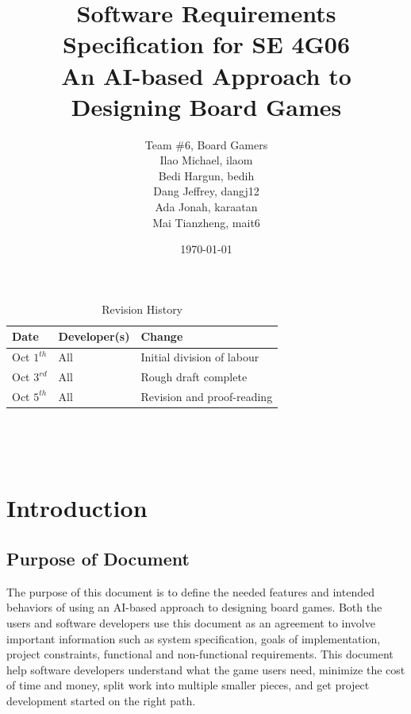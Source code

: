 \documentclass[12pt]{article}
\begin{document}
\begin{table}[hp]
\caption{Revision History} \label{TblRevisionHistory}
\begin{tabularx}{\textwidth}{llX}
\toprule
\textbf{Date} & \textbf{Developer(s)} & \textbf{Change}\\
\midrule
Oct $1^{th}$ & All & Initial division of labour\\
Oct $3^{rd}$ & All & Rough draft complete\\
Oct $5^{th}$ & All & Revision and proof-reading \\
\bottomrule
\end{tabularx}
\end{table}
\newpage

\title{Software Requirements Specification for SE 4G06 \\ An AI-based Approach to Designing Board Games} 
\author{Team \#6, Board Gamers
\\ Ilao Michael, ilaom
\\ Bedi Hargun, bedih
\\ Dang Jeffrey, dangj12
\\ Ada Jonah, karaatan
\\ Mai Tianzheng, mait6}
\date{\today}
	
\maketitle

~\newpage


\tableofcontents

~\newpage

\section{Introduction}
\subsection{Purpose of Document}

The purpose of this document is to define the needed features and intended behaviors of using an AI-based approach to designing board games. Both the users and software developers use this document as an agreement to involve important information such as system specification, goals of implementation, project constraints, functional and non-functional requirements. This document help software developers understand what the game users need, minimize the cost of time and money, split work into multiple smaller pieces, and get project development started on the right path.
\end{document}
